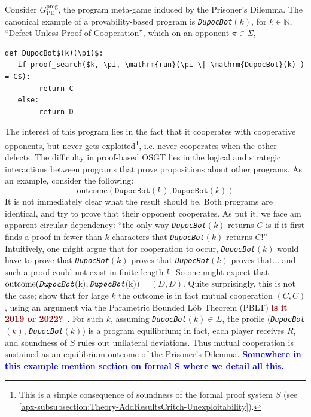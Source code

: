 \documentclass[twoside,11pt]{article}
\newcommand{\boldred}[1]{\textbf{\textcolor{darkred}{#1}}}
\newcommand{\boldblue}[1]{\textbf{\textcolor{blue}{#1}}}
\begin{document}
\begin{example}\label{ex:prisonerdilemma-3}
 Consider $G_{\mathrm{PD}}^{\mathrm{prog}}$, the program meta-game induced by the Prisoner's Dilemma. The canonical example of a provability-based program is \emph{\texttt{DupocBot}}$(k)$, for $k \in \mathbb{N}$, \enquote{Defect Unless Proof of Cooperation}, which on an opponent $\pi \in \Sigma$,
\begingroup
\upshape
\begin{lstlisting}[style=pdcode, mathescape=true]
def DupocBot$(k)(\pi)$:
   if proof_search($k, \pi, \mathrm{run}(\pi \| \mathrm{DupocBot}(k) ) = C$):
        return C
   else:
        return D
\end{lstlisting}
\endgroup
The interest of this program lies in the fact that it cooperates with cooperative opponents, but never gets exploited\footnote{This is a simple consequence of soundness of the formal proof system $S$ (see \cref{apx-subsubsection:Theory-AddResultsCritch-Unexploitability}).}, i.e. never cooperates when the other defects. The difficulty in proof-based OSGT lies in the logical and strategic interactions between programs that prove propositions about other programs. As an example, consider the following:
\begingroup
\upshape
\[
\mathrm{outcome}(\mathrm{\texttt{DupocBot}}(k), \mathrm{\texttt{DupocBot}}(k))
\]
\endgroup
It is not immediately clear what the result should be. Both programs are identical, and try to prove that their opponent cooperates. As \citet{Critch} put it, we face am apparent circular dependency: \enquote{the only way \emph{\texttt{DupocBot}}$(k)$ returns $C$ is if it first finds a proof in fewer than $k$ characters that \emph{\texttt{DupocBot}}$(k)$ returns $C$!} Intuitively, one might argue that for cooperation to occur, \emph{\texttt{DupocBot}}$(k)$ would have to prove that \emph{\texttt{DupocBot}}$(k)$ proves that \emph{\texttt{DupocBot}}$(k)$ proves that... and such a proof could not exist in finite length $k$. So one might expect that $\mathrm{outcome}(\emph{\texttt{DupocBot}}$(k)$, \emph{\texttt{DupocBot}}$(k)$) = (D, D)$. Quite surprisingly, this is not the case; \cite{Critch} show that for large $k$ the outcome is in fact mutual cooperation $(C, C)$, using an argument via the Parametric Bounded L\"ob Theorem (PBLT) \boldred{is it 2019 or 2022?}~\citep[Theorem~4.2]{Critch_pblt}. For such $k$, assuming \emph{\texttt{DupocBot}}$(k) \in \Sigma$, the profile (\emph{\texttt{DupocBot}}$(k)$, \emph{\texttt{DupocBot}}$(k)$) is a program equilibrium; in fact, each player receives $R$, and soundness of $S$ rules out unilateral deviations. Thus mutual cooperation is sustained as an equilibrium outcome of the Prisoner's Dilemma. \boldblue{Somewhere in this example mention section on formal S where we detail all this.}
\end{example}
\end{document}
